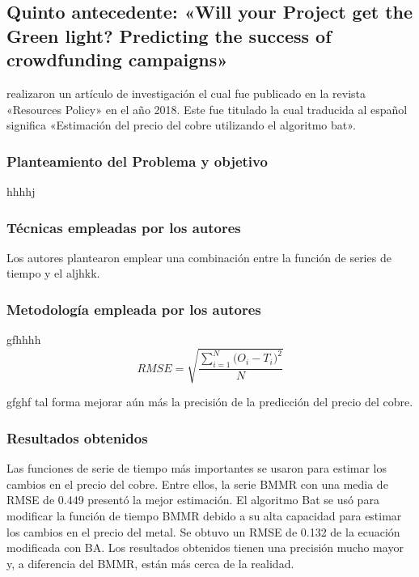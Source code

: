 \subsection{Quinto antecedente: «Will your Project get the Green light? Predicting the success of crowdfunding campaigns» \citep*{pr_chen2015predcrowd}}
\citeauthor{pr_chen2015predcrowd} realizaron un artículo de investigación el cual fue publicado en la revista «Resources Policy» en el año 2018. Este fue titulado  la cual traducida al español significa «Estimación del precio del cobre utilizando el algoritmo bat».

\subsubsection{Planteamiento del Problema y objetivo }
hhhhj

\subsubsection{Técnicas empleadas por los autores}
Los autores plantearon emplear una combinación entre la función de series de tiempo y el aljhkk. 

\subsubsection{Metodología empleada por los autores}
gfhhhh
\begin{equation}  
\label{eq:RMSE}
RMSE = \sqrt{\frac{\sum_{i=1}^{N}{\Big(O_i -T_i\Big)^2}}{N}}
\end{equation}

gfghf tal forma mejorar aún más la precisión de la predicción del precio del cobre.

\subsubsection{Resultados obtenidos}
Las funciones de serie de tiempo más importantes se usaron para estimar los cambios en el precio del cobre. Entre ellos, la serie BMMR con una media de RMSE de 0.449 presentó la mejor estimación. El algoritmo Bat  se usó para modificar la función de tiempo BMMR debido a su alta capacidad para estimar los cambios en el precio del metal. Se obtuvo un RMSE de 0.132 de la ecuación modificada con BA. Los resultados obtenidos tienen una precisión mucho mayor y, a diferencia del BMMR, están más cerca de la realidad.


